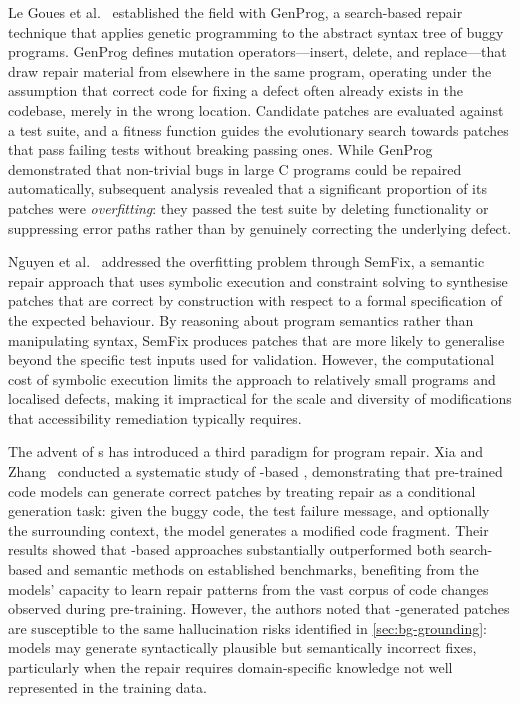 Le Goues et al.~\cite{legoues2012genprog} established the field with GenProg, a search-based repair technique that applies genetic programming to the abstract syntax tree of buggy programs. GenProg defines mutation operators---insert, delete, and replace---that draw repair material from elsewhere in the same program, operating under the assumption that correct code for fixing a defect often already exists in the codebase, merely in the wrong location. Candidate patches are evaluated against a test suite, and a fitness function guides the evolutionary search towards patches that pass failing tests without breaking passing ones. While GenProg demonstrated that non-trivial bugs in large C programs could be repaired automatically, subsequent analysis revealed that a significant proportion of its patches were \textit{overfitting}: they passed the test suite by deleting functionality or suppressing error paths rather than by genuinely correcting the underlying defect.

Nguyen et al.~\cite{nguyen2013semfix} addressed the overfitting problem through SemFix, a semantic repair approach that uses symbolic execution and constraint solving to synthesise patches that are correct by construction with respect to a formal specification of the expected behaviour. By reasoning about program semantics rather than manipulating syntax, SemFix produces patches that are more likely to generalise beyond the specific test inputs used for validation. However, the computational cost of symbolic execution limits the approach to relatively small programs and localised defects, making it impractical for the scale and diversity of modifications that accessibility remediation typically requires.

The advent of s has introduced a third paradigm for program repair. Xia and Zhang~\cite{xia2023apr} conducted a systematic study of -based , demonstrating that pre-trained code models can generate correct patches by treating repair as a conditional generation task: given the buggy code, the test failure message, and optionally the surrounding context, the model generates a modified code fragment. Their results showed that -based approaches substantially outperformed both search-based and semantic methods on established benchmarks, benefiting from the models' capacity to learn repair patterns from the vast corpus of code changes observed during pre-training. However, the authors noted that -generated patches are susceptible to the same hallucination risks identified in \cref{sec:bg-grounding}: models may generate syntactically plausible but semantically incorrect fixes, particularly when the repair requires domain-specific knowledge not well represented in the training data.

